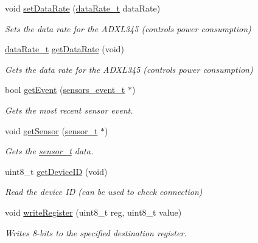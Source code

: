 \begin{DoxyCompactItemize}
void \hyperlink{class_adafruit___a_d_x_l345___unified_a8e837a3e456e5e17839447bbf65f76bd}{set\+Data\+Rate} (\hyperlink{_adafruit___a_d_x_l345___u_8h_a7b8465343401971414c6cc2581f28b0a}{data\+Rate\+\_\+t} data\+Rate)
\begin{DoxyCompactList}\small\item\em Sets the data rate for the A\+D\+X\+L345 (controls power consumption) \end{DoxyCompactList}\item 
\hyperlink{_adafruit___a_d_x_l345___u_8h_a7b8465343401971414c6cc2581f28b0a}{data\+Rate\+\_\+t} \hyperlink{class_adafruit___a_d_x_l345___unified_a3b8ae7da9a66e28b38b70a08c5646b02}{get\+Data\+Rate} (void)
\begin{DoxyCompactList}\small\item\em Gets the data rate for the A\+D\+X\+L345 (controls power consumption) \end{DoxyCompactList}\item 
bool \hyperlink{class_adafruit___a_d_x_l345___unified_a830e4a9d1729310c9cf0d0504b3d0229}{get\+Event} (\hyperlink{_adafruit___sensor_8h_structsensors__event__t}{sensors\+\_\+event\+\_\+t} $\ast$)
\begin{DoxyCompactList}\small\item\em Gets the most recent sensor event. \end{DoxyCompactList}\item 
void \hyperlink{class_adafruit___a_d_x_l345___unified_ac53068bb82bd03fc492542b468a30478}{get\+Sensor} (\hyperlink{_adafruit___sensor_8h_structsensor__t}{sensor\+\_\+t} $\ast$)
\begin{DoxyCompactList}\small\item\em Gets the \hyperlink{_adafruit___sensor_8h_structsensor__t}{sensor\+\_\+t} data. \end{DoxyCompactList}\item 
uint8\+\_\+t \hyperlink{class_adafruit___a_d_x_l345___unified_acf54ca46aa7e6a613807f489711a8ceb}{get\+Device\+ID} (void)
\begin{DoxyCompactList}\small\item\em Read the device ID (can be used to check connection) \end{DoxyCompactList}\item 
void \hyperlink{class_adafruit___a_d_x_l345___unified_a8f6b9e9598618fc0cf221c4b62f924d9}{write\+Register} (uint8\+\_\+t reg, uint8\+\_\+t value)
\begin{DoxyCompactList}\small\item\em Writes 8-\/bits to the specified destination register. \end{DoxyCompactList}\item 

\end{DoxyCompactItemize}
